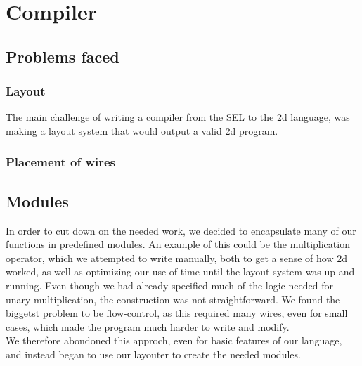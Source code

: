 \section{Compiler}
\label{compiler}

\subsection{Problems faced}
\label{compiler:problems}

\subsubsection{Layout}
\label{compiler:layout}
The main challenge of writing a compiler from the SEL to the 2d
language, was making a layout system that would output a valid 2d program. 

\subsubsection{Placement of wires}
\label{compiler:placement}

\subsection{Modules}
\label{compiler:modules}
In order to cut down on the needed work, we decided to encapsulate
many of our functions in predefined modules. An example of this could
be the multiplication operator, which we attempted to write manually,
both to get a sense of how 2d worked, as well as optimizing our use of
time until the layout system was up and running. Even though we had
already specified much of the logic needed for unary multiplication,
the construction was not straightforward. We found the biggetst
problem to be flow-control, as this required many wires, even for
small cases, which made the program much harder to write and modify.\\

We therefore abondoned this approch, even for basic features of our language, and instead began to use our layouter to create the needed modules.
